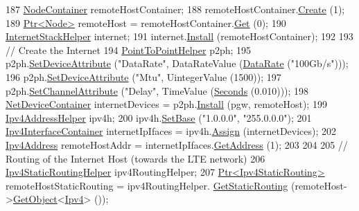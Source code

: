 \begin{DoxyCode}
187   \hyperlink{classns3_1_1NodeContainer}{NodeContainer} remoteHostContainer;
188   remoteHostContainer.\hyperlink{classns3_1_1NodeContainer_a787f059e2813e8b951cc6914d11dfe69}{Create} (1);
189   \hyperlink{classns3_1_1Ptr}{Ptr<Node>} remoteHost = remoteHostContainer.\hyperlink{classns3_1_1NodeContainer_a9ed96e2ecc22e0f5a3d4842eb9bf90bf}{Get} (0);
190   \hyperlink{classns3_1_1InternetStackHelper}{InternetStackHelper} internet;
191   internet.\hyperlink{classns3_1_1InternetStackHelper_a6645b412f31283d2d9bc3d8a95cebbc0}{Install} (remoteHostContainer);
192 
193   \textcolor{comment}{// Create the Internet}
194   \hyperlink{classns3_1_1PointToPointHelper}{PointToPointHelper} p2ph;
195   p2ph.\hyperlink{classns3_1_1PointToPointHelper_a4577f5ab8c387e5528af2e0fbab1152e}{SetDeviceAttribute} (\textcolor{stringliteral}{"DataRate"}, DataRateValue (\hyperlink{classns3_1_1DataRate}{DataRate} (\textcolor{stringliteral}{"100Gb/s"})));
196   p2ph.\hyperlink{classns3_1_1PointToPointHelper_a4577f5ab8c387e5528af2e0fbab1152e}{SetDeviceAttribute} (\textcolor{stringliteral}{"Mtu"}, UintegerValue (1500));
197   p2ph.\hyperlink{classns3_1_1PointToPointHelper_a6b5317fd17fb61e5a53f8d66a90b63b9}{SetChannelAttribute} (\textcolor{stringliteral}{"Delay"}, TimeValue (\hyperlink{group__timecivil_ga33c34b816f8ff6628e33d5c8e9713b9e}{Seconds} (0.010)));
198   \hyperlink{classns3_1_1NetDeviceContainer}{NetDeviceContainer} internetDevices = p2ph.\hyperlink{classns3_1_1PointToPointHelper_ab9162fea3e88722666fed1106df1f9ec}{Install} (pgw, remoteHost);
199   \hyperlink{classns3_1_1Ipv4AddressHelper}{Ipv4AddressHelper} ipv4h;
200   ipv4h.\hyperlink{classns3_1_1Ipv4AddressHelper_acf7b16dd25bac67e00f5e25f90a9a035}{SetBase} (\textcolor{stringliteral}{"1.0.0.0"}, \textcolor{stringliteral}{"255.0.0.0"});
201   \hyperlink{classns3_1_1Ipv4InterfaceContainer}{Ipv4InterfaceContainer} internetIpIfaces = ipv4h.\hyperlink{classns3_1_1Ipv4AddressHelper_af8e7f4a1a7e74c00014a1eac445a27af}{Assign} (internetDevices);
202   \hyperlink{classns3_1_1Ipv4Address}{Ipv4Address} remoteHostAddr = internetIpIfaces.\hyperlink{classns3_1_1Ipv4InterfaceContainer_ae63208dcd222be986822937ee4aa828c}{GetAddress} (1);
203 
204 
205   \textcolor{comment}{// Routing of the Internet Host (towards the LTE network)}
206   \hyperlink{classns3_1_1Ipv4StaticRoutingHelper}{Ipv4StaticRoutingHelper} ipv4RoutingHelper;
207   \hyperlink{classns3_1_1Ptr}{Ptr<Ipv4StaticRouting>} remoteHostStaticRouting = ipv4RoutingHelper.
      \hyperlink{classns3_1_1Ipv4StaticRoutingHelper_a731206e50d305695dac7fb2ef963a4bb}{GetStaticRouting} (remoteHost->\hyperlink{classns3_1_1Object_a13e18c00017096c8381eb651d5bd0783}{GetObject}<\hyperlink{classns3_1_1Ipv4}{Ipv4}> ());

\end{DoxyCode}
